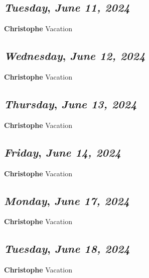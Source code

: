 \def\day{\textit{June 11, 2024}}
\def\weekday{\textit{Tuesday}}
\subsection*{\weekday, \day}
\textbf {Christophe}
Vacation
\def\day{\textit{June 12, 2024}}
\def\weekday{\textit{Wednesday}}
\subsection*{\weekday, \day}
\textbf {Christophe}
Vacation
\def\day{\textit{June 13, 2024}}
\def\weekday{\textit{Thursday}}
\subsection*{\weekday, \day}
\textbf {Christophe}
Vacation
\def\day{\textit{June 14, 2024}}
\def\weekday{\textit{Friday}}
\subsection*{\weekday, \day}
\textbf {Christophe}
Vacation
\def\day{\textit{June 17, 2024}}
\def\weekday{\textit{Monday}}
\subsection*{\weekday, \day}
\textbf {Christophe}
Vacation
\def\day{\textit{June 18, 2024}}
\def\weekday{\textit{Tuesday}}
\subsection*{\weekday, \day}
\textbf {Christophe}
Vacation
\def\day{\textit{June 19, 2024}}
\def\weekday{\textit{Wednesday}}
